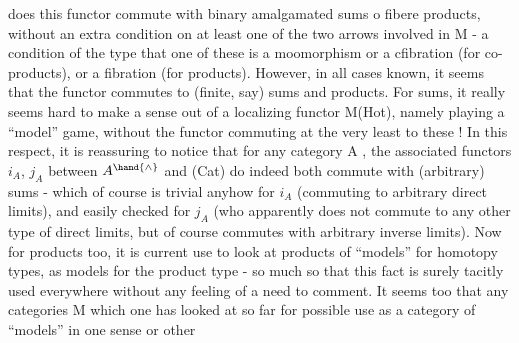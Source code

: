 does this functor commute with binary amalgamated sums o  fibere products,
without an extra condition on at least one of the two arrows involved in
M  -  a condition of the type that one of these is a moomorphism or a
cfibration (for co-products),  or a fibration (for products).  However,
in all cases known,  it seems that the functor commutes to (finite,  say)
sums and products.  For sums,  it really seems hard to make a sense out of
a localizing functor  M\hand{$\longrightarrow$}(Hot),  namely playing a ``model'' game,  without
the functor commuting at the very least to these !  In this respect,  it
is reassuring to notice that for any category A ,  the associated functors
$i_A$, $j_A$ between  $A^{\hand{\wedge}}$ and (Cat) do indeed both commute with (arbitrary) sums
-  which of course is trivial anyhow for $i_A$ (commuting to arbitrary direct
limits),  and easily checked for $j_A$ (who apparently does not commute to any
other type of direct limits,  but of course commutes with arbitrary inverse
limits).  Now for products too,  it is current use to look at products of
``models'' for homotopy types,  as models for the product type  -  so much so
that this fact is surely tacitly used everywhere\hand{,} without any feeling of
a need to comment.  It seems too that any categories M which one has looked
at so far for possible use as a category of ``models'' in one sense or other
